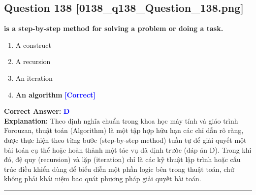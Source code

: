 \documentclass[11pt,a4paper]{article}
\begin{document}
\begin{minipage}{\textwidth}
\subsection*{Question 138 \quad \footnotesize{[0138\_q138\_Question\_138.png]}}
\noindent \textbf{is a step-by-step method for solving a problem or doing a task.}

\begin{enumerate}[label=\Alph*.]
    \item A construct
    \item A recursion
    \item An iteration
    \item \textbf{An algorithm} \hfill \textcolor{blue}{\textbf{[Correct]}}
\end{enumerate}

\noindent \textbf{Correct Answer:} \textcolor{blue}{\textbf{D}} \\[2pt]
\noindent \textbf{Explanation:} Theo định nghĩa chuẩn trong khoa học máy tính và giáo trình Forouzan, thuật toán (Algorithm) là một tập hợp hữu hạn các chỉ dẫn rõ ràng, được thực hiện theo từng bước (step-by-step method) tuần tự để giải quyết một bài toán cụ thể hoặc hoàn thành một tác vụ đã định trước (đáp án D). Trong khi đó, đệ quy (recursion) và lặp (iteration) chỉ là các kỹ thuật lập trình hoặc cấu trúc điều khiển dùng để biểu diễn một phần logic bên trong thuật toán, chứ không phải khái niệm bao quát phương pháp giải quyết bài toán.

\par\vspace{0.3cm}
\hrule
\vspace{0.3cm}
\end{minipage}
\end{document}
